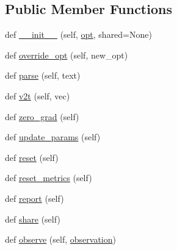 \subsection*{Public Member Functions}
\begin{DoxyCompactItemize}
\item 
def \hyperlink{classparlai_1_1agents_1_1legacy__agents_1_1seq2seq_1_1seq2seq__v0_1_1Seq2seqAgent_a88801410eefdb0b71bb674a0768e87b9}{\+\_\+\+\_\+init\+\_\+\+\_\+} (self, \hyperlink{classparlai_1_1agents_1_1legacy__agents_1_1seq2seq_1_1seq2seq__v0_1_1Seq2seqAgent_a8e4926c0c0da6bd7d530c44aa5416731}{opt}, shared=None)
\item 
def \hyperlink{classparlai_1_1agents_1_1legacy__agents_1_1seq2seq_1_1seq2seq__v0_1_1Seq2seqAgent_ad40d38a1cc2cafe32c43477740b4a164}{override\+\_\+opt} (self, new\+\_\+opt)
\item 
def \hyperlink{classparlai_1_1agents_1_1legacy__agents_1_1seq2seq_1_1seq2seq__v0_1_1Seq2seqAgent_a073830870e283f88ee45a95c0ae8ad2f}{parse} (self, text)
\item 
def \hyperlink{classparlai_1_1agents_1_1legacy__agents_1_1seq2seq_1_1seq2seq__v0_1_1Seq2seqAgent_a8f6de929b475d3915c159c48165b4575}{v2t} (self, vec)
\item 
def \hyperlink{classparlai_1_1agents_1_1legacy__agents_1_1seq2seq_1_1seq2seq__v0_1_1Seq2seqAgent_a0be9f1e378a403284d8afac5648fbf4d}{zero\+\_\+grad} (self)
\item 
def \hyperlink{classparlai_1_1agents_1_1legacy__agents_1_1seq2seq_1_1seq2seq__v0_1_1Seq2seqAgent_a3933d4fdc5e603b1a168d92e7da77151}{update\+\_\+params} (self)
\item 
def \hyperlink{classparlai_1_1agents_1_1legacy__agents_1_1seq2seq_1_1seq2seq__v0_1_1Seq2seqAgent_a56d246fd8b6bcf41726181c17cdc2762}{reset} (self)
\item 
def \hyperlink{classparlai_1_1agents_1_1legacy__agents_1_1seq2seq_1_1seq2seq__v0_1_1Seq2seqAgent_ae76435bf7acee9501188de47c0ba6991}{reset\+\_\+metrics} (self)
\item 
def \hyperlink{classparlai_1_1agents_1_1legacy__agents_1_1seq2seq_1_1seq2seq__v0_1_1Seq2seqAgent_a83a444ecb418dfb4381147f23653dd7b}{report} (self)
\item 
def \hyperlink{classparlai_1_1agents_1_1legacy__agents_1_1seq2seq_1_1seq2seq__v0_1_1Seq2seqAgent_ac050147b69c47182730e92866f64156a}{share} (self)
\item 
def \hyperlink{classparlai_1_1agents_1_1legacy__agents_1_1seq2seq_1_1seq2seq__v0_1_1Seq2seqAgent_a8419a9652b14a16cedff86206a7bb613}{observe} (self, \hyperlink{classparlai_1_1agents_1_1legacy__agents_1_1seq2seq_1_1seq2seq__v0_1_1Seq2seqAgent_a4473b0e478d7928c2b59ab653c8334fb}{observation})

\end{DoxyCompactItemize}

